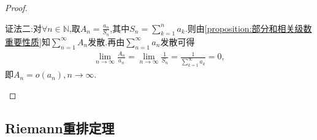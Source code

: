 \documentclass[../../main.tex]{subfiles}%
\begin{document}
\begin{proof}
\begin{enumerate}[(1)]
{\color{blue}证法二:}对$\forall n\in \mathbb{N}$,取$A_n=\frac{a_n}{S_n}$,其中$S_n=\sum_{k=1}^{n}a_k$.则由\cref{proposition:部分和相关级数重要性质}知$\sum\limits_{n=1}^\infty A_n$发散.再由$\sum\limits_{n=1}^\infty a_n$发散可得
\begin{align*}
\lim_{n\rightarrow \infty} \frac{A_n}{a_n}=\lim_{n\rightarrow \infty} \frac{1}{S_n}=\frac{1}{\sum_{k=1}^{\infty}{a_k}}=0,
\end{align*}
即$A_n=o\left( a_n \right) ,n\rightarrow \infty .$
\end{enumerate}
\end{proof}



\subsection{Riemann重排定理}
\end{document}
